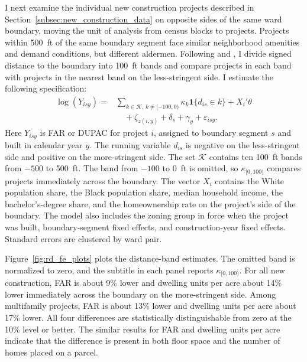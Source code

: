 I next examine the individual new construction projects described in Section~\ref{subsec:new_construction_data} on opposite sides of the same ward boundary, moving the unit of analysis from census blocks to projects.
Projects within 500~ft of the same boundary segment face similar neighborhood amenities and demand conditions, but different aldermen.
Following \citet{bayer_unified_2007} and \citet{kulka_under_2026}, I divide signed distance to the boundary into 100~ft bands and compare projects in each band with projects in the nearest band on the less-stringent side.
I estimate the following specification:
%
\begin{equation} \label{eq:segment_fe}
\begin{aligned}
    \log(Y_{isy}) ={}&
    \sum_{k \in \mathcal{K},\,k \neq [-100,0)}
    \kappa_k \mathbf{1}\{d_{is} \in k\}
    + X_i'\theta \\
    &\quad
    + \zeta_{z(i,y)}
    + \delta_s
    + \gamma_y
    + \varepsilon_{isy}.
\end{aligned}
\end{equation}
%
Here $Y_{isy}$ is FAR or DUPAC for project $i$, assigned to boundary segment $s$ and built in calendar year $y$.
The running variable $d_{is}$ is negative on the less-stringent side and positive on the more-stringent side.
The set $\mathcal{K}$ contains ten 100~ft bands from $-500$ to 500~ft.
The band from $-100$ to 0~ft is omitted, so $\kappa_{[0,100)}$ compares projects immediately across the boundary.
The vector $X_i$ contains the White population share, the Black population share, median household income, the bachelor's-degree share, and the homeownership rate on the project's side of the boundary.
The model also includes the zoning group in force when the project was built, boundary-segment fixed effects, and construction-year fixed effects.
Standard errors are clustered by ward pair.

Figure~\ref{fig:rd_fe_plots} plots the distance-band estimates.
The omitted band is normalized to zero, and the subtitle in each panel reports $\kappa_{[0,100)}$.
For all new construction, FAR is about 9\% lower and dwelling units per acre about 14\% lower immediately across the boundary on the more-stringent side.
Among multifamily projects, FAR is about 13\% lower and dwelling units per acre about 17\% lower.
All four differences are statistically distinguishable from zero at the 10\% level or better.
The similar results for FAR and dwelling units per acre indicate that the difference is present in both floor space and the number of homes placed on a parcel.

